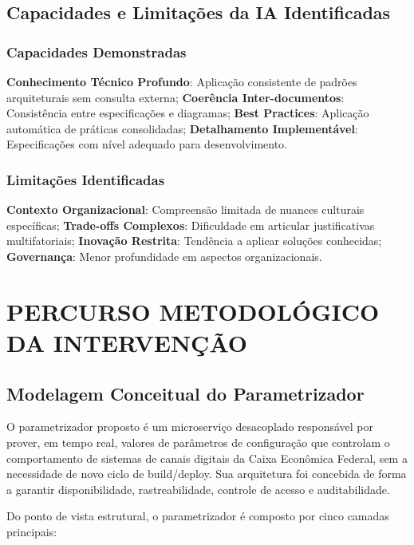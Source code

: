 \section{Capacidades e Limitações da IA Identificadas}

\subsection{Capacidades Demonstradas}

\textbf{Conhecimento Técnico Profundo}: Aplicação consistente de padrões arquiteturais sem consulta externa; \textbf{Coerência Inter-documentos}: Consistência entre especificações e diagramas; \textbf{Best Practices}: Aplicação automática de práticas consolidadas; \textbf{Detalhamento Implementável}: Especificações com nível adequado para desenvolvimento.

\subsection{Limitações Identificadas}

\textbf{Contexto Organizacional}: Compreensão limitada de nuances culturais específicas; \textbf{Trade-offs Complexos}: Dificuldade em articular justificativas multifatoriais; \textbf{Inovação Restrita}: Tendência a aplicar soluções conhecidas; \textbf{Governança}: Menor profundidade em aspectos organizacionais.

\chapter{PERCURSO METODOLÓGICO DA INTERVENÇÃO}

\section{Modelagem Conceitual do Parametrizador}

O parametrizador proposto é um microserviço desacoplado responsável por prover, em tempo real, valores de parâmetros de configuração que controlam o comportamento de sistemas de canais digitais da Caixa Econômica Federal, sem a necessidade de novo ciclo de build/deploy. Sua arquitetura foi concebida de forma a garantir disponibilidade, rastreabilidade, controle de acesso e auditabilidade.

Do ponto de vista estrutural, o parametrizador é composto por cinco camadas principais:

